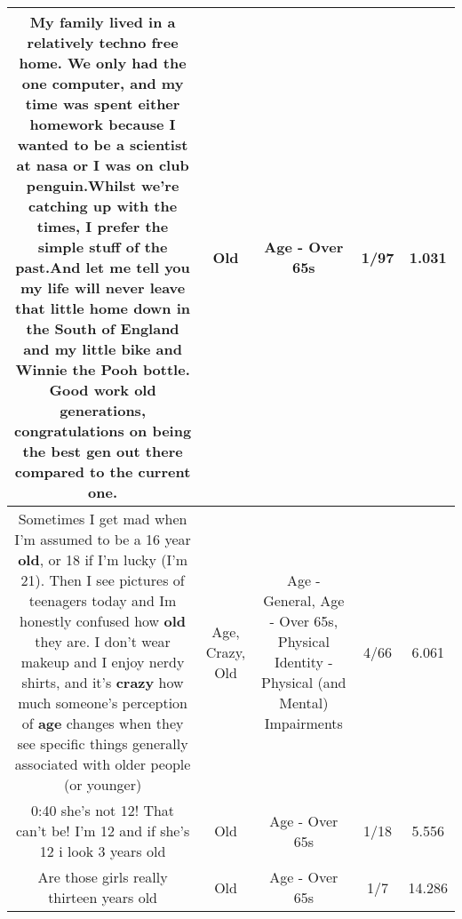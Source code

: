 \documentclass[11pt]{article}
\newlength\mylength
\begin{document}
\begin{center}
\begin{longtable}{|C{.65\mylength}|C{.30\mylength}|C{.12\mylength}|C{.12\mylength}|C{.12\mylength}|}
  \small My family lived in a relatively techno free home. We only had the one computer, and my time was spent either homework because I wanted to be a scientist at nasa or I was on club penguin.Whilst we're catching up with the times, I prefer the simple stuff of the past.And let me tell you my life will never leave that little home down in the South of England and my little bike and Winnie the Pooh bottle. Good work \textbf{old} generations, congratulations on being the best gen out there compared to the current one.\normalsize   & Old & Age - Over 65s & 1/97 & 1.031 \\  \hline
  \small Sometimes I get mad when I'm assumed to be a 16 year \textbf{old}, or 18 if I'm lucky (I'm 21). Then I see pictures of teenagers today and Im honestly confused how \textbf{old} they are. I don't wear makeup and I enjoy nerdy shirts, and it's \textbf{crazy} how much someone's perception of \textbf{age} changes when they see specific things generally associated with older people (or younger)\normalsize   & Age, Crazy, Old & Age - General, Age - Over 65s, Physical Identity - Physical (and Mental) Impairments & 4/66 & 6.061 \\  \hline
  \small 0:40 she's not 12! That can't be! I'm 12 and if she's 12 i look 3 years old\normalsize   & Old & Age - Over 65s & 1/18 & 5.556 \\  \hline
  \small Are those girls really thirteen years old\normalsize   & Old & Age - Over 65s & 1/7 & 14.286 \\  \hline

\end{longtable}
\end{center}
\end{document}
